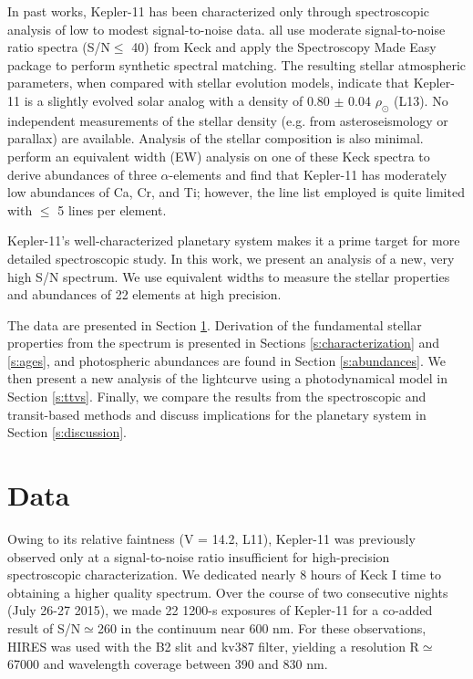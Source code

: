 \documentclass[oneside]{emulateapj}
\begin{document}
In past works, Kepler-11 has been characterized only through spectroscopic analysis of low to modest signal-to-noise data. \citet[L11, L13][]{Rowe2014} all use moderate signal-to-noise ratio spectra (S/N$\leq$ 40) from Keck and apply the Spectroscopy Made Easy package \citep[SME,][]{Valenti1996} to perform synthetic spectral matching. The resulting stellar atmospheric parameters, when compared with stellar evolution models, indicate that Kepler-11 is a slightly evolved solar analog with a density of 0.80 $\pm$ 0.04 $\rho_{\odot}$ (L13). No independent measurements of the stellar density (e.g. from asteroseismology or parallax) are available. Analysis of the stellar composition is also minimal. \citet{Adibekyan2012b} perform an equivalent width (EW) analysis on one of these Keck spectra to derive abundances of three $\alpha$-elements and find that Kepler-11 has moderately low abundances of Ca, Cr, and Ti; however, the line list employed is quite limited with $\leq$ 5 lines per element.

Kepler-11's well-characterized planetary system makes it a prime target for more detailed spectroscopic study. In this work, we present an analysis of a new, very high S/N spectrum. We use equivalent widths to measure the stellar properties and abundances of 22 elements at high precision.

The data are presented in Section \ref{s:data}. Derivation of the fundamental stellar properties from the spectrum is presented in Sections \ref{s:characterization} and \ref{s:ages}, and photospheric abundances are found in Section \ref{s:abundances}. We then present a new analysis of the \Kepler lightcurve using a photodynamical model in Section \ref{s:ttvs}. Finally, we compare the results from the spectroscopic and transit-based methods and discuss implications for the planetary system in Section \ref{s:discussion}.


\section{Data}
\label{s:data}

Owing to its relative faintness (V = 14.2, L11), Kepler-11 was previously observed only at a signal-to-noise ratio insufficient for high-precision spectroscopic characterization. We dedicated nearly 8 hours of Keck I time to obtaining a higher quality spectrum. Over the course of two consecutive nights (July 26-27 2015), we made 22 1200-s exposures of Kepler-11 for a co-added result of S/N$\simeq$260 in the continuum near 600 nm. For these observations, HIRES was used with the B2 slit and kv387 filter, yielding a resolution R$\simeq$67000 and wavelength coverage between 390 and 830 nm.
\end{document}

